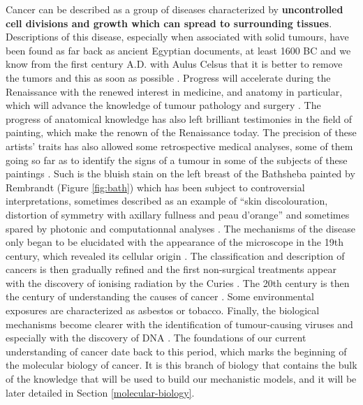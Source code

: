 \documentclass[a4paper,12pt,twoside,onecolumn,openright,final,oldfontcommands]{memoir}
\begin{document}
Cancer can be described as a group of diseases characterized by
\textbf{uncontrolled cell divisions and growth which can spread to
surrounding tissues}. Descriptions of this disease, especially when
associated with solid tumours, have been found as far back as ancient
Egyptian documents, at least 1600 BC and we know from the first century
A.D. with Aulus Celsus that it is better to remove the tumors and this
as soon as possible \citep{hajdu2011note}. Progress will accelerate
during the Renaissance with the renewed interest in medicine, and
anatomy in particular, which will advance the knowledge of tumour
pathology and surgery \citep{hajdu2011note2}. The progress of anatomical
knowledge has also left brilliant testimonies in the field of painting,
which make the renown of the Renaissance today. The precision of these
artists' traits has also allowed some retrospective medical analyses,
some of them going so far as to identify the signs of a tumour in some
of the subjects of these paintings \citep{bianucci2018earliest}. Such is
the bluish stain on the left breast of the Bathsheba painted by
Rembrandt (Figure \ref{fig:bath}) which has been subject to
controversial interpretations, sometimes described as an example of
``skin discolouration, distortion of symmetry with axillary fullness and
peau d'orange'' \citep{braithwaite1983rembrandt} and sometimes spared by
photonic and computationnal analyses \citep{heijblom2014monte}. The
mechanisms of the disease only began to be elucidated with the
appearance of the microscope in the 19th century, which revealed its
cellular origin \citep{hajdu2012note}. The classification and
description of cancers is then gradually refined and the first
non-surgical treatments appear with the discovery of ionising radiation
by the Curies \citep{hajdu2012note2}. The 20th century is then the
century of understanding the causes of cancer
\citep{hajdu2013note, hajdu2013note2}. Some environmental exposures are
characterized as asbestos or tobacco. Finally, the biological mechanisms
become clearer with the identification of tumour-causing viruses and
especially with the discovery of DNA \citep{watson1953molecular}. The
foundations of our current understanding of cancer date back to this
period, which marks the beginning of the molecular biology of cancer. It
is this branch of biology that contains the bulk of the knowledge that
will be used to build our mechanistic models, and it will be later
detailed in Section \ref{molecular-biology}.
\end{document}
